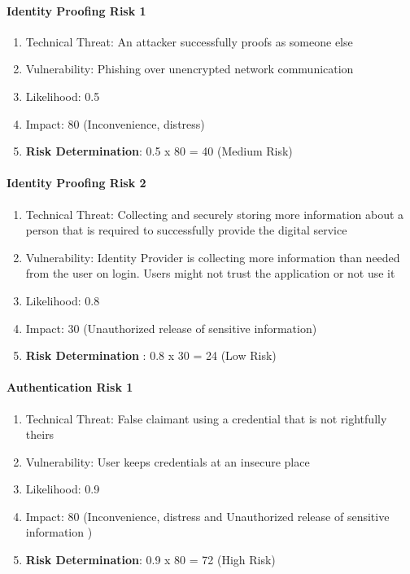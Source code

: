 \paragraph{Identity Proofing Risk 1}

\begin{enumerate}
	\item Technical Threat: An attacker successfully proofs as someone else
	\item Vulnerability: Phishing over unencrypted network communication
	\item Likelihood: 0.5
	\item Impact: 80 (Inconvenience, distress)
	\item \textbf{Risk Determination}: 0.5 x 80 = 40 (Medium Risk) 
\end{enumerate}

\paragraph{Identity Proofing Risk 2}
\begin{enumerate}
	\item Technical Threat: Collecting and securely storing more information about a person that is required to successfully provide the digital service
	\item Vulnerability: Identity Provider is collecting more information than needed from the user on login. Users might not trust the application or not use it
	\item Likelihood: 0.8
	\item Impact: 30  (Unauthorized release of sensitive information)
	\item \textbf{Risk Determination} : 0.8 x 30 = 24 (Low Risk)
\end{enumerate}


\paragraph{Authentication Risk 1}
\begin{enumerate}
	\item Technical Threat: False claimant using a credential that is not rightfully theirs
	\item Vulnerability: User keeps credentials at an insecure place
	\item Likelihood: 0.9
	\item Impact: 80 (Inconvenience, distress and Unauthorized release of sensitive information )
	\item \textbf{Risk Determination}: 0.9 x 80 = 72 (High Risk) 
\end{enumerate}

